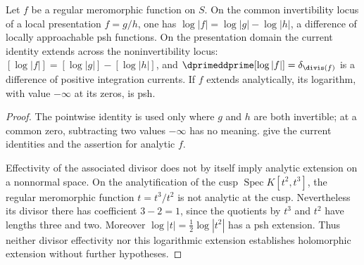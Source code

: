 \begin{corollary}
\label{cor:ch15-meromorphic-difference}
Let $f$ be a regular meromorphic function on $S$.  On the common
invertibility locus of a local presentation $f=g/h$, one has
$\log|f|=\log|g|-\log|h|$, a difference of locally approachable psh
functions.  On the presentation domain the current identity extends
across the noninvertibility locus:
$[\log|f|]=[\log|g|]-[\log|h|]$, and
$\dprimeddprime[\log|f|]=\delta_{\divis(f)}$ is a difference of positive
integration currents.  If $f$ extends analytically, its logarithm, with
value $-\infty$ at its zeros, is psh.
\end{corollary}

\begin{proof}
The pointwise identity is used only where $g$ and $h$ are both invertible;
at a common zero, subtracting two values $-\infty$ has no meaning.
give the current identities and the assertion for analytic $f$.

Effectivity of the associated divisor does not by itself imply analytic
extension on a nonnormal space.  On the analytification of the cusp
$\operatorname{Spec}K[t^2,t^3]$, the regular meromorphic function $t=t^3/t^2$ is not analytic
at the cusp.  Nevertheless its divisor there has coefficient $3-2=1$,
since the quotients by $t^3$ and $t^2$ have lengths three and two.
Moreover $\log|t|=\tfrac12\log|t^2|$ has a psh extension.  Thus neither
divisor effectivity nor this logarithmic extension establishes holomorphic
extension without further hypotheses.
\end{proof}

